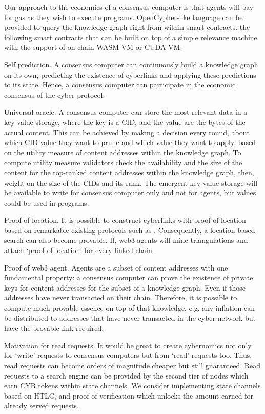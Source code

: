 \documentclass[8pt,oneside]{amsart}
\newcommand{\linkgreen}[2]{\href{#1}{\color{green}{#2}}}
\newcommand{\code}[1]{{\PlayBold #1}}
\begin{document}
\begin{Abstract}
Our approach to the economics of a consensus computer is that agents will pay for gas as they wish to execute programs. OpenCypher-like language can be provided to query the knowledge graph right from within smart contracts. \linkgreen{https://medium.com/@karpathy/software-2-0-a64152b37c35}{We can envision} the following smart contracts that can be built on top of a simple relevance machine with the support of on-chain WASM VM or CUDA VM:

\code{Self prediction}. A consensus computer can continuously build a knowledge graph on its own, predicting the existence of cyberlinks and applying these predictions to its state. Hence, a consensus computer can participate in the economic consensus of the cyber protocol.

\code{Universal oracle}. A consensus computer can store the most relevant data in a key-value storage, where the key is a CID, and the value are the bytes of the actual content. This can be achieved by making a decision every round, about which CID value they want to prune and which value they want to apply, based on the utility measure of content addresses within the knowledge graph. To compute utility measure validators check the availability and the size of the content for the top-ranked content addresses within the knowledge graph, then, weight on the size of the CIDs and its rank. The emergent key-value storage will be available to write for consensus computer only and not for agents, but values could be used in programs.

\code{Proof of location}. It is possible to construct cyberlinks with proof-of-location based on remarkable existing protocols such as \linkgreen{https://ipfs.io/ipfs/QmZYKGuLHf2h1mZrhiP2FzYsjj3tWt2LYduMCRbpgi5pKG}{Foam}. Consequently, a location-based search can also become provable. If, web3 agents will mine triangulations and attach ‘proof of location’ for every linked chain.

\code{Proof of web3 agent}. Agents are a subset of content addresses with one fundamental property: a consensus computer can prove the existence of private keys for content addresses for the subset of a knowledge graph. Even if those addresses have never transacted on their chain. Therefore, it is possible to compute much provable essence on top of that knowledge, e.g. any inflation can be distributed to addresses that have never transacted in the cyber network but have the provable link required.

\code{Motivation for read requests}. It would be great to create cybernomics not only for ‘write’ requests to consensus computers but from ‘read’ requests too. Thus, read requests can become orders of magnitude cheaper but still guaranteed. Read requests to a search engine can be provided by the second tier of nodes which earn CYB tokens within state channels. We consider implementing state channels based on HTLC, and proof of verification which unlocks the amount earned for already served requests.


\end{Abstract}
\end{document}
